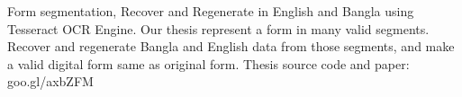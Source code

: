 \begin{cventries}
  \cventry
    {}
    {Form segmentation, Recover and Regenerate in English and Bangla using Tesseract OCR Engine.}
    {}
    {}
    {
        Our thesis represent a form in many valid segments. Recover and regenerate Bangla and English data from those
        segments, and make a valid digital form same as original form. 
    Thesis source code and paper: goo.gl/axbZFM
    }
  {}
\end{cventries}

